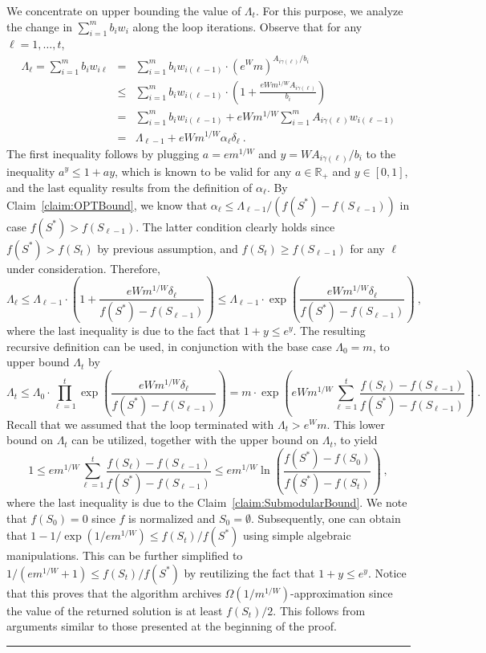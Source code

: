 \documentclass[11pt]{article}
\theoremstyle{plain}
\theoremstyle{definition}
\newcommand{\qedsymb}{\hfill{\rule{2mm}{2mm}}}
\renewenvironment{proof}{\begin{trivlist} \item[\hspace{\labelsep}{\bf \noindent Proof.\/}] }{\qedsymb\end{trivlist}}\newenvironment{proofof}[1]{\begin{trivlist} \item[\hspace{\labelsep}{\bf \noindent Proof of #1.\/}] }{\qedsymb\end{trivlist}}\newenvironment{MyEqn}[1]{\setlength\arraycolsep{2pt}\begin{eqnarray*} #1}{\end{eqnarray*}}
\newcommand{\bbR}{\mathbb{R}}
\begin{document}
\begin{proof}
We concentrate on upper bounding the value of $\Lambda_t$. For
this purpose, we analyze the change in $\sum_{i=1}^m b_i w_i$
along the loop iterations. Observe that for any $\ell = 1, \ldots,
t$,
\begin{eqnarray*}
\Lambda_{\ell} = \sum_{i=1}^m b_i w_{i\ell} & = & \sum_{i=1}^m b_i w_{i(\ell-1)} \cdot \left(e^W m\right)^{A_{i\gamma(\ell)}/b_i}\\
& \leq & \sum_{i=1}^m b_i w_{i(\ell-1)} \cdot \left(1 + \frac{e W m^{1/W} A_{i\gamma(\ell)}}{b_i}\right)\\
& = & \sum_{i=1}^m b_i w_{i(\ell-1)} + e W m^{1/W} \sum_{i=1}^m A_{i\gamma(\ell)} w_{i(\ell-1)}\\
& = & \Lambda_{\ell - 1} + e W m^{1/W} \alpha_\ell \delta_\ell \ .
\end{eqnarray*}
The first inequality follows by plugging $a = e m^{1/W}$ and $y =
W A_{i\gamma(\ell)}/ b_i$ to the inequality $a^y \leq 1 + ay$,
which is known to be valid for any $a \in \bbR_+$ and $y \in
[0,1]$, and the last equality results from the definition of
$\alpha_\ell$. By Claim~\ref{claim:OPTBound}, we know that
$\alpha_\ell \leq \Lambda_{\ell-1} / (f(S^*) - f(S_{\ell-1}))$ in
case $f(S^*) > f(S_{\ell-1})$. The latter condition clearly holds
since $f(S^*) > f(S_t)$ by previous assumption, and $f(S_t) \geq
f(S_{\ell-1})$ for any $\ell$ under consideration. Therefore,
$$
\Lambda_\ell \leq \Lambda_{\ell-1} \cdot \left(1 + \frac{e W
m^{1/W} \delta_\ell}{f(S^*) - f(S_{\ell-1})}\right) \leq
\Lambda_{\ell-1} \cdot \exp\left(\frac{e W m^{1/W}
\delta_\ell}{f(S^*) - f(S_{\ell-1})}\right) \ ,
$$
where the last inequality is due to the fact that $1 + y \leq
e^y$. The resulting recursive definition can be used, in
conjunction with the base case $\Lambda_0 = m$, to upper bound
$\Lambda_t$ by
$$
\Lambda_t \leq \Lambda_0 \cdot \prod_{\ell = 1}^{t} \exp
\left(\frac{e W m^{1/W} \delta_\ell}{f(S^*) -
f(S_{\ell-1})}\right) = m \cdot \exp \left(e W m^{1/W} \sum_{\ell
= 1}^{t}\frac{ f(S_\ell) - f(S_{\ell-1})}{f(S^*) -
f(S_{\ell-1})}\right) \ .
$$
Recall that we assumed that the loop terminated with $\Lambda_t
> e^W m$. This lower bound on $\Lambda_t$ can be utilized, together
with the upper bound on $\Lambda_t$, to yield
$$
1 \leq em^{1/W} \sum_{\ell = 1}^{t}\frac{ f(S_\ell) -
f(S_{\ell-1})}{f(S^*) - f(S_{\ell-1})} \leq em^{1/W}
\ln\left(\frac{f(S^*) - f(S_0)}{f(S^*) - f(S_t)} \right) \ ,
$$
where the last inequality is due to the
Claim~\ref{claim:SubmodularBound}. We note that $f(S_0) = 0$ since
$f$ is normalized and $S_0 = \emptyset$. Subsequently, one can
obtain that $1 - 1 / \exp(1 / em^{1/W}) \leq f(S_t) / f(S^*)$
using simple algebraic manipulations. This can be further
simplified to $1 / (em^{1/W} + 1) \leq f(S_t) / f(S^*)$ by
reutilizing the fact that $1 + y \leq e^y$. Notice that this
proves that the algorithm archives $\Omega(1 /
m^{1/W})$-approximation since the value of the returned solution
is at least $f(S_t) / 2$. This follows from arguments similar to
those presented at the beginning of the proof.~
\end{proof}
\end{document}
